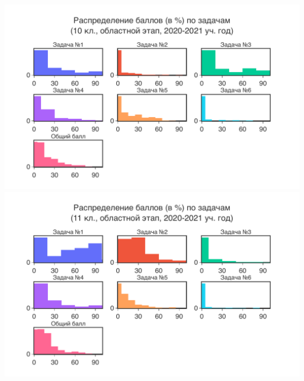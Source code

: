\includegraphics[width=\linewidth]{../export/pdf/results/2023/oblast/grade10-dist-problemwise.pdf}
\includegraphics[width=\linewidth]{../export/pdf/results/2023/oblast/grade11-dist-problemwise.pdf}

